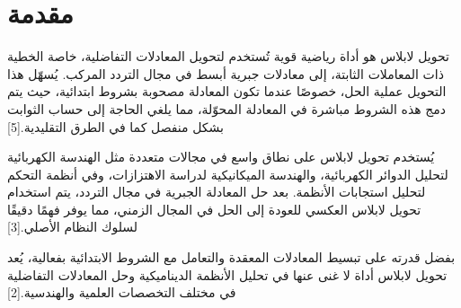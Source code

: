 \chapter*{مقدمة}

​تحويل لابلاس هو أداة رياضية قوية تُستخدم لتحويل المعادلات التفاضلية، خاصة الخطية ذات المعاملات الثابتة، إلى معادلات جبرية أبسط في مجال التردد المركب. يُسهّل هذا التحويل عملية الحل، خصوصًا عندما تكون المعادلة مصحوبة بشروط ابتدائية، حيث يتم دمج هذه الشروط مباشرة في المعادلة المحوّلة، مما يلغي الحاجة إلى حساب الثوابت بشكل منفصل كما في الطرق التقليدية.​[5]

يُستخدم تحويل لابلاس على نطاق واسع في مجالات متعددة مثل الهندسة الكهربائية لتحليل الدوائر الكهربائية، والهندسة الميكانيكية لدراسة الاهتزازات، وفي أنظمة التحكم لتحليل استجابات الأنظمة. بعد حل المعادلة الجبرية في مجال التردد، يتم استخدام تحويل لابلاس العكسي للعودة إلى الحل في المجال الزمني، مما يوفر فهمًا دقيقًا لسلوك النظام الأصلي.​[3]


بفضل قدرته على تبسيط المعادلات المعقدة والتعامل مع الشروط الابتدائية بفعالية، يُعد تحويل لابلاس أداة لا غنى عنها في تحليل الأنظمة الديناميكية وحل المعادلات التفاضلية في مختلف التخصصات العلمية والهندسية.[2]
